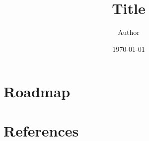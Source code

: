 \documentclass[11pt]{beamer}
\title[Short Title]{Title}
\author[Short Author]{Author}
\date{\today}
\begin{document}

\begin{frame}
    \maketitle
\end{frame}

\section*{Roadmap}
\begin{frame}
    \tableofcontents[hideothersubsections]
\end{frame}

\section*{References}
\nocite{*}
\begin{frame}


\end{frame}
\end{document}
